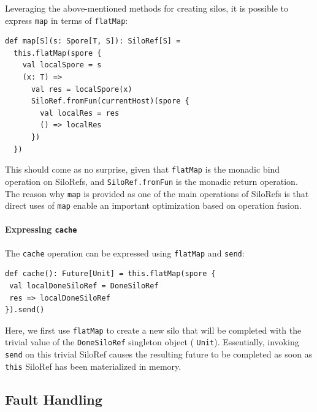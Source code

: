 \documentclass{jfp1}
\begin{document}
Leveraging the above-mentioned methods for creating silos, it is possible to
express \verb|map| in terms of \verb|flatMap|:

\begin{lstlisting}
def map[S](s: Spore[T, S]): SiloRef[S] =
  this.flatMap(spore {
    val localSpore = s
    (x: T) =>
      val res = localSpore(x)
      SiloRef.fromFun(currentHost)(spore {
        val localRes = res
        () => localRes
      })
  })
\end{lstlisting}
\noindent
This should come as no surprise, given that \verb|flatMap| is the monadic bind
operation on SiloRefs, and \verb|SiloRef.fromFun| is the monadic return
operation. The reason why \verb|map| is provided as one of the main operations
of SiloRefs is that direct uses of \verb|map| enable an important optimization
based on operation fusion.

\paragraph{Expressing \texttt{cache}}

The \verb|cache| operation can be expressed using \verb|flatMap| and
\verb|send|:

\begin{lstlisting}
def cache(): Future[Unit] = this.flatMap(spore {
 val localDoneSiloRef = DoneSiloRef
 res => localDoneSiloRef
}).send()

\end{lstlisting}
\noindent
Here, we first use \verb|flatMap| to create a new silo that will be completed
with the trivial value of the \verb|DoneSiloRef| singleton object (\eg
\verb|Unit|). Essentially, invoking \verb|send| on this trivial SiloRef causes
the resulting future to be completed as soon as \verb|this| SiloRef has been
materialized in memory.




\subsection{Fault Handling}
\label{sec:fault-handling}
\end{document}
